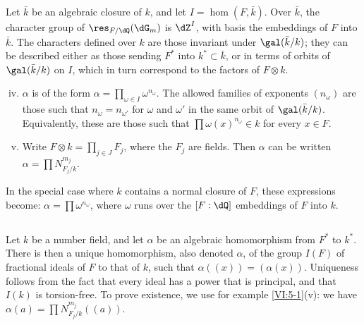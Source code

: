 Let $\bar k$ be an algebraic closure of $k$, and let $I=\hom(F,\bar k)$. Over 
$\bar k$, the character group of $\res_{F/\dQ}(\dG_m)$ is $\dZ^I$, with basis 
the embeddings of $F$ into $\bar k$. The characters defined over $k$ 
are those invariant under $\gal(\bar k/k)$; they can be described either as 
those sending $F^\ast$ into $k^\ast\subset \bar k$, or in terms of 
orbits of $\gal(\bar k/k)$ on $I$, which in turn correspond to the factors of 
$F\otimes k$. 
\begin{enumerate}[(i)]
\setcounter{enumi}{3}
  \item $\alpha$ is of the form 
    $\alpha=\prod_{\omega\in I} \omega^{n_\omega}$. The allowed families of exponents 
    $(n_\omega)$ are those such that $n_\omega=n_{\omega'}$ for 
    $\omega$ and $\omega'$ in the same orbit of $\gal(\bar k/k)$. Equivalently, these 
    are those such that $\prod \omega(x)^{n_\omega}\in k$ for every 
    $x\in F$. 
\item Write $F\otimes k=\prod_{j\in J} F_j$, where the $F_j$ are fields. 
    Then $\alpha$ can be written $\alpha=\prod N_{F_j/k}^{m_j}$. 
\end{enumerate}

In the special case where $k$ contains a normal closure of $F$, these 
expressions become: $\alpha=\prod \omega^{n_\omega}$, where $\omega$ 
runs over the $[F:\dQ]$ embeddings of $F$ into $k$. 





\subsection{}\label{VI:5-2}

Let $k$ be a number field, and let $\alpha$ be an algebraic homomorphism 
from $F^\ast$ to $k^\ast$. There is then a unique 
homomorphism, also denoted $\alpha$, of the group $I(F)$ 
of fractional ideals of $F$ to that of $k$, such that $\alpha((x))=(\alpha(x))$. 
Uniqueness follows from the fact that every ideal has a power that is 
principal, and that $I(k)$ is torsion-free. To prove 
existence, we use for example \ref{VI:5-1}(v): we have 
$\alpha(a) = \prod N_{F_j/k}^{m_j}((a))$. 





\subsection{}\label{VI:5-3}

